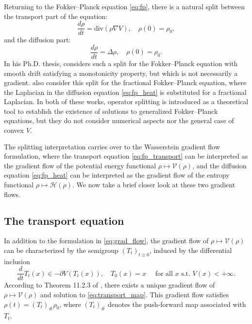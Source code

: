 \documentclass[final,12pt]{colt2018}
\begin{document}
Returning to the Fokker--Planck equation \eqref{eq:fp}, there is a natural split between the transport part of the equation:
\begin{equation}\label{eq:fp_transport}
\frac{d\rho}{d t} = \text{div}(\rho \nabla V), \quad \rho(0) = \rho_0,
\end{equation}
and the diffusion part:
\begin{equation}\label{eq:fp_heat}
\frac{d \rho}{d t} = \Delta \rho, \quad \rho(0) = \rho_0.
\end{equation}
In his Ph.D. thesis, \citet{stojkovic2011geometric} considers such a split for the Fokker--Planck equation with smooth drift satisfying a monotonicity property, but which is not necessarily a gradient. \citet{bowles2015weak} also consider this split for the fractional Fokker--Planck equation, where the Laplacian in the diffusion equation \eqref{eq:fp_heat} is substituted for a fractional Laplacian. In both of these works, operator splitting is introduced as a theoretical tool to establish the existence of solutions to generalized Fokker--Planck equations, but they do not consider numerical aspects nor the general case of convex $V$.

The splitting interpretation carries over to the Wasserstein gradient flow formulation, where the transport equation \eqref{eq:fp_transport} can be interpreted as the gradient flow of the potential energy functional $\rho \mapsto \mathcal{V}(\rho)$, and the diffusion equation \eqref{eq:fp_heat} can be interpreted as the gradient flow of the entropy functional $\rho \mapsto \mathcal{H}(\rho)$. We now take a brief closer look at these two gradient flows.


\subsection{The transport equation}
In addition to the formulation in \eqref{eq:grad_flow}, the gradient flow of $\rho \mapsto \mathcal{V}(\rho)$ can be characterized by the semigroup $(T_t)_{t\geq 0 }$, induced by the differential inclusion
\begin{equation} \label{eq:transport_map}
\frac{d}{dt}T_t(x)  \in  -\partial V(T_t(x)),  \quad \text{$T_0(x) = x\quad$ for all $x$ s.t. $V(x)<+\infty$}.
\end{equation}
According to Theorem 11.2.3 of \citet{ambrosio2005}, there exists a unique gradient flow of $\rho \mapsto \mathcal{V}(\rho)$ and solution to \eqref{eq:transport_map}. This gradient flow satisfies $\rho(t) = (T_t)_\#\rho_0$, where $(T_t)_\#$ denotes the push-forward map associated with $T_t$.
\end{document}

